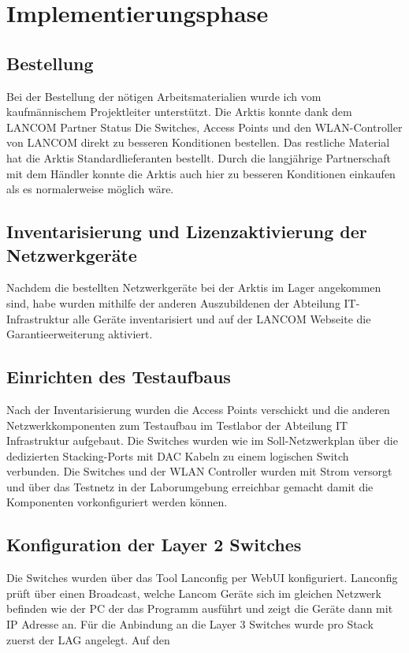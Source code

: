 \section{Implementierungsphase} 
\label{sec:Implementierungsphase}
\subsection{Bestellung}
\label{sec:Bestellung}
Bei der Bestellung der nötigen Arbeitsmaterialien wurde ich vom kaufmännischem Projektleiter unterstützt. Die \ac{Arktis} konnte dank dem LANCOM Partner Status Die Switches, Access Points und den WLAN-Controller von LANCOM direkt zu besseren Konditionen bestellen. Das restliche Material hat die \ac{Arktis} Standardlieferanten bestellt. Durch die langjährige Partnerschaft mit dem Händler konnte die Arktis auch hier zu besseren Konditionen einkaufen als es normalerweise möglich wäre.
\subsection{Inventarisierung und Lizenzaktivierung der Netzwerkgeräte}
\label{Inventarisierung und Lizenzaktivierung der Netzwerkgeräte}
Nachdem die bestellten Netzwerkgeräte bei der \ac{Arktis} im Lager angekommen sind, habe wurden mithilfe der anderen Auszubildenen der Abteilung IT-Infrastruktur alle Geräte inventarisiert und auf der LANCOM Webseite die Garantieerweiterung aktiviert. 

\subsection{Einrichten des Testaufbaus}
\label{sec:Einrichten des Testaufbaus}
Nach der Inventarisierung wurden die Access Points verschickt und die anderen Netzwerkkomponenten zum Testaufbau im Testlabor der Abteilung IT Infrastruktur aufgebaut. Die Switches wurden wie im Soll-Netzwerkplan über die dedizierten Stacking-Ports mit \ac{DAC} Kabeln zu einem logischen Switch verbunden. Die Switches und der WLAN Controller wurden mit Strom versorgt und über das Testnetz in der Laborumgebung erreichbar gemacht damit die Komponenten vorkonfiguriert werden können.


\subsection{Konfiguration der Layer 2 Switches}
\label{sec:Konfiguration der Layer 2 Switche}
Die Switches wurden über das Tool Lanconfig per WebUI konfiguriert. Lanconfig prüft über einen Broadcast, welche Lancom Geräte sich im gleichen Netzwerk befinden wie der PC der das Programm ausführt und zeigt die Geräte dann mit IP Adresse an. Für die Anbindung an die Layer 3 Switches wurde pro Stack zuerst der \ac{LAG} angelegt. Auf den  \ac{}






